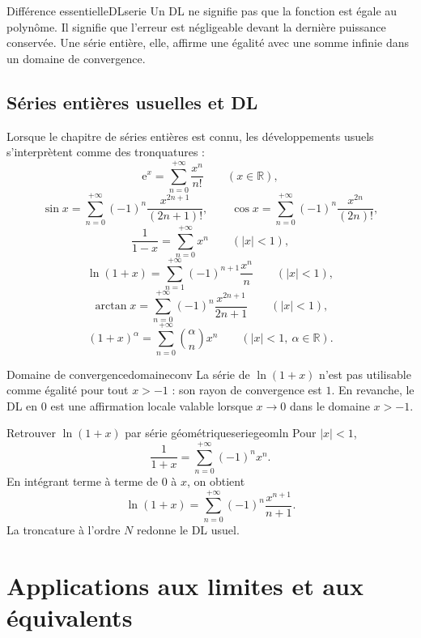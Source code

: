 \documentclass[11pt,a4paper]{article}
\newcommand{\R}{\mathbb{R}}
\newcommand{\e}{\mathrm{e}}
\begin{document}
\begin{retenirbox}{Différence essentielle}{DLserie}
Un DL ne signifie pas que la fonction est égale au polynôme. Il signifie que l'erreur est négligeable devant la dernière puissance conservée. Une série entière, elle, affirme une égalité avec une somme infinie dans un domaine de convergence.
\end{retenirbox}

\subsection{Séries entières usuelles et DL}

Lorsque le chapitre de séries entières est connu, les développements usuels s'interprètent comme des tronquatures :
\[
  \e^x=\sum_{n=0}^{+\infty}\frac{x^n}{n!}\qquad(x\in\R),
\]
\[
  \sin x=\sum_{n=0}^{+\infty}(-1)^n\frac{x^{2n+1}}{(2n+1)!},
  \qquad
  \cos x=\sum_{n=0}^{+\infty}(-1)^n\frac{x^{2n}}{(2n)!},
\]
\[
  \frac1{1-x}=\sum_{n=0}^{+\infty}x^n\qquad(|x|<1),
\]
\[
  \ln(1+x)=\sum_{n=1}^{+\infty}(-1)^{n+1}\frac{x^n}{n}\qquad(|x|<1),
\]
\[
  \arctan x=\sum_{n=0}^{+\infty}(-1)^n\frac{x^{2n+1}}{2n+1}\qquad(|x|<1),
\]
\[
  (1+x)^\alpha=\sum_{n=0}^{+\infty}\binom\alpha n x^n\qquad(|x|<1,\ \alpha\in\R).
\]

\begin{warningbox}{Domaine de convergence}{domaineconv}
La série de $\ln(1+x)$ n'est pas utilisable comme égalité pour tout $x>-1$ : son rayon de convergence est $1$. En revanche, le DL en $0$ est une affirmation locale valable lorsque $x\to0$ dans le domaine $x>-1$.
\end{warningbox}

\begin{examplebox}{Retrouver $\ln(1+x)$ par série géométrique}{seriegeomln}
Pour $|x|<1$,
\[
  \frac1{1+x}=\sum_{n=0}^{+\infty}(-1)^n x^n.
\]
En intégrant terme à terme de $0$ à $x$, on obtient
\[
  \ln(1+x)=\sum_{n=0}^{+\infty}(-1)^n\frac{x^{n+1}}{n+1}.
\]
La troncature à l'ordre $N$ redonne le DL usuel.
\end{examplebox}

\section{Applications aux limites et aux équivalents}
\end{document}

